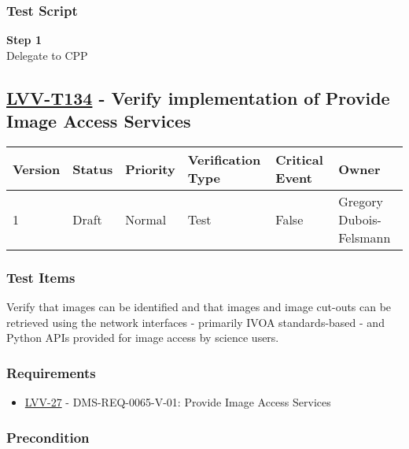 \subsubsection{Test Script}\label{test-script-10}

\textbf{Step 1}\\
Delegate to CPP\\[2\baselineskip]

\hypertarget{lvv-t134---verify-implementation-of-provide-image-access-services}{\subsection{\texorpdfstring{\href{https://jira.lsstcorp.org/secure/Tests.jspa\#/testCase/LVV-T134}{LVV-T134}
- Verify implementation of Provide Image Access
Services}{LVV-T134 - Verify implementation of Provide Image Access Services}}\label{lvv-t134---verify-implementation-of-provide-image-access-services}}

\begin{longtable}[]{@{}llllll@{}}
\toprule
Version & Status & Priority & Verification Type & Critical Event &
Owner\tabularnewline
\midrule
\endhead
1 & Draft & Normal & Test & False & Gregory
Dubois-Felsmann\tabularnewline
\bottomrule
\end{longtable}

\subsubsection{Test Items}\label{test-items-11}

Verify that images can be identified and that images and image cut-outs
can be retrieved using the network interfaces - primarily IVOA
standards-based - and Python APIs provided for image access by science
users.

\subsubsection{Requirements}\label{requirements-11}

\begin{itemize}
\tightlist
\item
  \href{https://jira.lsstcorp.org/browse/LVV-27}{LVV-27} -
  DMS-REQ-0065-V-01: Provide Image Access Services
\end{itemize}

\subsubsection{Precondition}\label{precondition-1}

